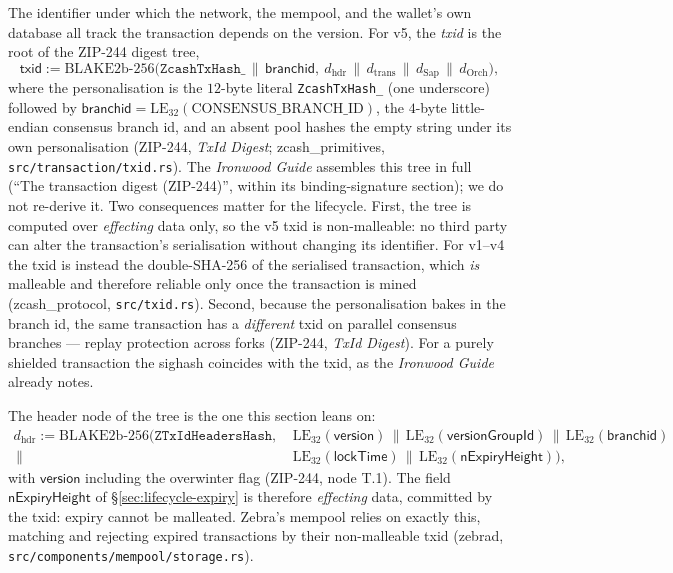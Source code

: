 \documentclass[11pt,a4paper]{article}
\theoremstyle{definition}
\begin{document}
The identifier under which the network, the mempool, and the wallet's own
database all track the transaction depends on the version. For v5, the
\emph{txid} is the root of the ZIP-244 digest tree,
\[
\mathsf{txid} := \mathrm{BLAKE2b\text{-}256}\bigl(\texttt{ZcashTxHash\_}
  \,\|\, \mathsf{branchid},\ d_{\mathrm{hdr}} \,\|\, d_{\mathrm{trans}}
  \,\|\, d_{\mathrm{Sap}} \,\|\, d_{\mathrm{Orch}}\bigr),
\]
where the personalisation is the $12$-byte literal
\texttt{ZcashTxHash\_} (one underscore) followed by
$\mathsf{branchid} = \mathrm{LE}_{32}(\mathrm{CONSENSUS\_BRANCH\_ID})$, the
$4$-byte little-endian consensus branch id, and an absent pool hashes the
empty string under its own personalisation (ZIP-244, \emph{TxId Digest};
\textsf{zcash\_primitives}, \texttt{src/transaction/txid.rs}). The
\emph{Ironwood Guide} assembles this tree in full (``The transaction digest
(ZIP-244)'', within its binding-signature section); we do not re-derive it.
Two consequences matter for the lifecycle. First, the tree is computed over
\emph{effecting} data only, so the v5 txid is non-malleable: no third party
can alter the transaction's serialisation without changing its identifier.
For v1--v4 the txid is instead the double-SHA-256 of the serialised
transaction, which \emph{is} malleable and therefore reliable only once the
transaction is mined (\textsf{zcash\_protocol}, \texttt{src/txid.rs}).
Second, because the personalisation bakes in the branch id, the same
transaction has a \emph{different} txid on parallel consensus branches ---
replay protection across forks (ZIP-244, \emph{TxId Digest}). For a purely
shielded transaction the sighash coincides with the txid, as the
\emph{Ironwood Guide} already notes.

The header node of the tree is the one this section leans on:
\[
\begin{aligned}
d_{\mathrm{hdr}} := \mathrm{BLAKE2b\text{-}256}\bigl(
  \texttt{ZTxIdHeadersHash},\ &
  \mathrm{LE}_{32}(\mathsf{version}) \,\|\,
  \mathrm{LE}_{32}(\mathsf{versionGroupId}) \,\|\,
  \mathrm{LE}_{32}(\mathsf{branchid}) \\[-1pt]
  \,\|\,\ & \mathrm{LE}_{32}(\mathsf{lockTime}) \,\|\,
  \mathrm{LE}_{32}(\mathsf{nExpiryHeight})\bigr),
\end{aligned}
\]
with $\mathsf{version}$ including the overwinter flag (ZIP-244, node T.1).
The field $\mathsf{nExpiryHeight}$ of \S\ref{sec:lifecycle-expiry} is
therefore \emph{effecting} data, committed by the txid: expiry cannot be
malleated. Zebra's mempool relies on exactly this, matching and rejecting
expired transactions by their non-malleable txid (\textsf{zebrad},
\texttt{src/components/mempool/storage.rs}).
\end{document}
